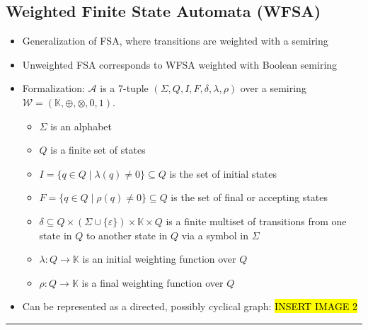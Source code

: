\subsection*{Weighted Finite State Automata (WFSA)}
\begin{itemize}
    \item Generalization of FSA, where transitions are weighted with a semiring
    \item Unweighted FSA corresponds to WFSA weighted with Boolean semiring
    \item Formalization: $\mathcal{A}$ is a 7-tuple $(\Sigma, Q, I, F, \delta, \lambda, \rho)$ over a semiring $\mathcal{W} = (\mathbb{K}, \oplus, \otimes, 0, 1)$.
    \begin{itemize}
        \item $\Sigma$ is an alphabet
        \item $Q$ is a finite set of states
        \item $I = \{q \in Q \mid \lambda(q) \neq 0\} \subseteq Q$ is the set of initial states
        \item $F = \{q \in Q \mid \rho(q) \neq 0\} \subseteq Q$ is the set of final or accepting states
        \item $\delta \subseteq Q \times (\Sigma \cup \{\varepsilon\}) \times \mathbb{K} \times Q$ is a finite multiset of transitions from one state in $Q$ to another state in $Q$ via a symbol in $\Sigma$
        \item $\lambda : Q \to \mathbb{K}$ is an initial weighting function over $Q$
        \item $\rho : Q \to \mathbb{K}$ is a final weighting function over $Q$
    \end{itemize}
    \item Can be represented as a directed, possibly cyclical graph:
    \hl{INSERT IMAGE 2}
\end{itemize}

{\color{black}\hrule height 0.001mm}

